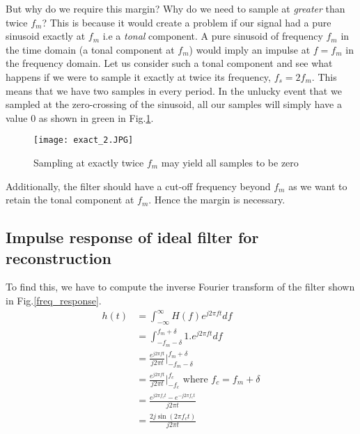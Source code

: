 But why do we require this margin? Why do we need to sample at \textit{greater} than twice $f_{m}$? This is because it would create a problem if our signal had a pure sinusoid exactly at $f_{m}$ i.e a \textit{tonal} component. A pure sinusoid of frequency $f_{m}$ in the time domain (a tonal component at $f_{m}$) would imply an impulse at $f = f_{m}$ in the frequency domain. Let us consider such a tonal component and see what happens if we were to sample it exactly at twice its frequency, $f_{s} = 2f_{m}$. This means that we have two samples in every period. In the unlucky event that we sampled at the zero-crossing of the sinusoid, all our samples will simply have a value $0$ as shown in green in Fig.\ref{exact_2}. 
\begin{figure}[h] 
        \centering
        
                \texttt{[image: exact\_2.JPG]}
                \caption{Sampling at exactly twice $f_{m}$ may yield all samples to be zero}
                \label{exact_2}
        
\end{figure}

Additionally, the filter should have a cut-off frequency beyond $f_{m}$ as we want to retain the tonal component at $f_{m}$. Hence the margin is necessary. 

\subsection{Impulse response of ideal filter for reconstruction}
To find this, we have to compute the inverse Fourier transform of the filter shown in Fig.\ref{freq_response}. 
\begin{equation} \label{deriv}
\begin{split}
h(t)   & = \int_{-\infty}^{\infty} H(f)e^{j2\pi ft}df \\
       & = \int_{-f_{m}-\delta}^{f_{m}+\delta} 1. e^{j2\pi ft}df \\
       & = \frac{e^{j2\pi ft}}{j2\pi t} \rvert_{-f_{m}-\delta}^{f_{m}+\delta} \\
       & = \frac{e^{j2\pi ft}}{j2\pi t} \rvert_{-f_{c}}^{f_{c}}  \mbox{ where } f_{c} = f_{m} + \delta \\
       & = \frac{e^{j2\pi f_{c}t} - e^{-j2\pi f_{c}t}}{j2\pi t} \\
       & = \frac{2j\sin (2\pi f_{c}t)}{j2\pi t} 
\end{split}
\end{equation}

